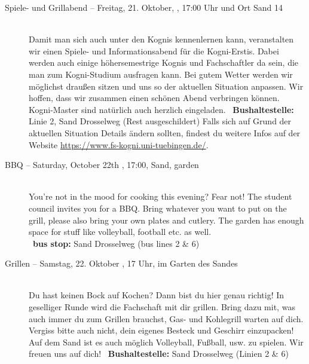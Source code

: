 \begin{description}
\ifkogwiss
    \item[Spiele- und Grillabend -- Freitag, 21. Oktober, \YEAR, 17:00 Uhr und Ort Sand 14]\ \\
         Damit man sich auch unter den Kognis kennenlernen kann, veranstalten wir einen Spiele- und Informationsabend für die Kogni-Erstis. Dabei werden auch einige höhersemestrige Kognis und Fachschaftler da sein, die man zum Kogni-Studium ausfragen kann. Bei gutem Wetter werden wir möglichst draußen sitzen und uns so der aktuellen Situation anpassen. Wir hoffen, dass wir zusammen einen schönen Abend verbringen können. Kogni-Master sind natürlich auch herzlich eingeladen.
	~\textbf{Bushaltestelle:} Linie 2, Sand Drosselweg (Rest ausgeschildert)
	Falls sich auf Grund der aktuellen Situation Details ändern sollten, findest du weitere Infos auf der Website \url{https://www.fs-kogni.uni-tuebingen.de/}.
\fi

\ifml
	\item[BBQ -- Saturday, October 22th \YEAR, 17:00, Sand, garden]~\\
	You're not in the mood for cooking this evening? Fear not!
    The student council invites you for a BBQ. Bring whatever you want to put on the grill,
    please also bring your own plates and cutlery. The garden has enough space for stuff like volleyball, football etc. as well.\\
	~\textbf{bus stop:} Sand Drosselweg (bus lines 2 \& 6)
\else
	\item[Grillen -- Samstag, 22. Oktober \YEAR, 17 Uhr, im Garten des Sandes]~\\
	Du hast keinen Bock auf Kochen? Dann bist du hier genau richtig! In geselliger Runde wird die Fachschaft mit dir grillen.
	Bring dazu mit, was auch immer du zum Grillen brauchst, Gas- und Kohlegrill warten auf dich. Vergiss bitte auch nicht, dein eigenes Besteck und Geschirr einzupacken!\\
	Auf dem Sand ist es auch möglich Volleyball, Fußball, usw. zu spielen. Wir freuen uns auf dich!
	~\textbf{Bushaltestelle:} Sand Drosselweg (Linien 2 \& 6)
\fi


\end{description}
